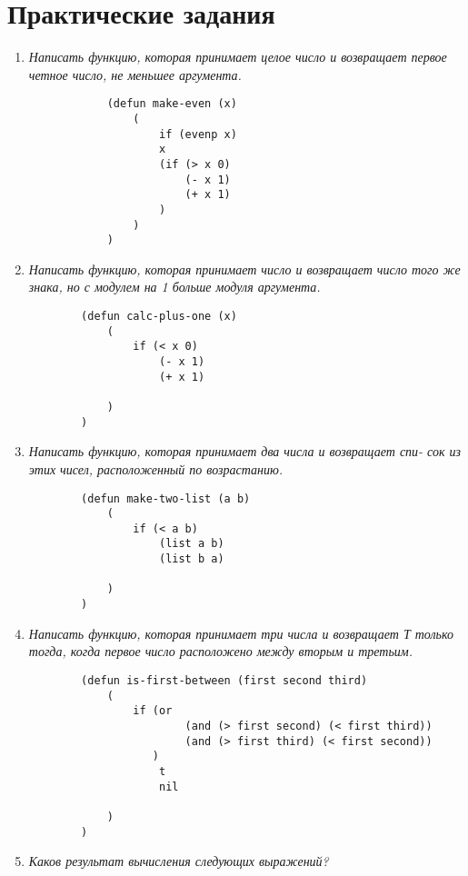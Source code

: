 \chapter{Практические задания}

\begin{enumerate}[wide=0pt]

	\item \textit{Написать функцию, которая принимает целое число и возвращает первое
	четное число, не меньшее аргумента.}

		\begin{lstlisting}
			(defun make-even (x)
				(
					if (evenp x)
					x
					(if (> x 0)
						(- x 1)
						(+ x 1)
					)
				)
			)
		\end{lstlisting}


	\item  \textit{Написать функцию, которая принимает число и возвращает число
	того же знака, но с модулем на 1 больше модуля аргумента.}

	\begin{lstlisting}
		(defun calc-plus-one (x)
			(
				if (< x 0)
					(- x 1)
					(+ x 1)
				
			)
		)
	\end{lstlisting}

	\item  \textit{Написать функцию, которая принимает два числа и возвращает спи-
	сок из этих чисел, расположенный по возрастанию.}

	\begin{lstlisting}
		(defun make-two-list (a b)
			(
				if (< a b)
					(list a b)
					(list b a)
				
			)
		)
	\end{lstlisting}

	\item  \textit{Написать функцию, которая принимает три числа и возвращает Т
	только тогда, когда первое число расположено между вторым и третьим.}

	\begin{lstlisting}
		(defun is-first-between (first second third)
			(
				if (or 
						(and (> first second) (< first third))
						(and (> first third) (< first second))
				   )
					t
					nil
				
			)
		)
	\end{lstlisting}

	\item  \textit{Каков результат вычисления следующих выражений?}
	

\end{enumerate}
